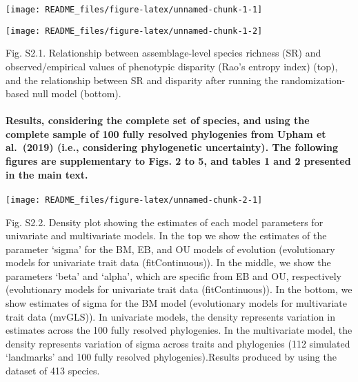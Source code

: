 \documentclass[
]{article}
\begin{document}
\begin{center}\texttt{[image: README\_files/figure-latex/unnamed-chunk-1-1]} \end{center}

\begin{center}\texttt{[image: README\_files/figure-latex/unnamed-chunk-1-2]} \end{center}

Fig. S2.1. Relationship between assemblage-level species richness (SR)
and observed/empirical values of phenotypic disparity (Rao's entropy
index) (top), and the relationship between SR and disparity after
running the randomization-based null model (bottom).

\newpage

\hypertarget{results-considering-the-complete-set-of-species-and-using-the-complete-sample-of-100-fully-resolved-phylogenies-from-upham-et-al.-2019-i.e.-considering-phylogenetic-uncertainty.-the-following-figures-are-supplementary-to-figs.-2-to-5-and-tables-1-and-2-presented-in-the-main-text.}{%
\paragraph{Results, considering the complete set of species, and using
the complete sample of 100 fully resolved phylogenies from Upham et
al.~(2019) (i.e., considering phylogenetic uncertainty). The following
figures are supplementary to Figs. 2 to 5, and tables 1 and 2 presented
in the main
text.}\label{results-considering-the-complete-set-of-species-and-using-the-complete-sample-of-100-fully-resolved-phylogenies-from-upham-et-al.-2019-i.e.-considering-phylogenetic-uncertainty.-the-following-figures-are-supplementary-to-figs.-2-to-5-and-tables-1-and-2-presented-in-the-main-text.}}

\begin{center}\texttt{[image: README\_files/figure-latex/unnamed-chunk-2-1]} \end{center}

Fig. S2.2. Density plot showing the estimates of each model parameters
for univariate and multivariate models. In the top we show the estimates
of the parameter `sigma' for the BM, EB, and OU models of evolution
(evolutionary models for univariate trait data (fitContinuous)). In the
middle, we show the parameters `beta' and `alpha', which are specific
from EB and OU, respectively (evolutionary models for univariate trait
data (fitContinuous)). In the bottom, we show estimates of sigma for the
BM model (evolutionary models for multivariate trait data (mvGLS)). In
univariate models, the density represents variation in estimates across
the 100 fully resolved phylogenies. In the multivariate model, the
density represents variation of sigma across traits and phylogenies (112
simulated `landmarks' and 100 fully resolved phylogenies).Results
produced by using the dataset of 413 species.
\end{document}
